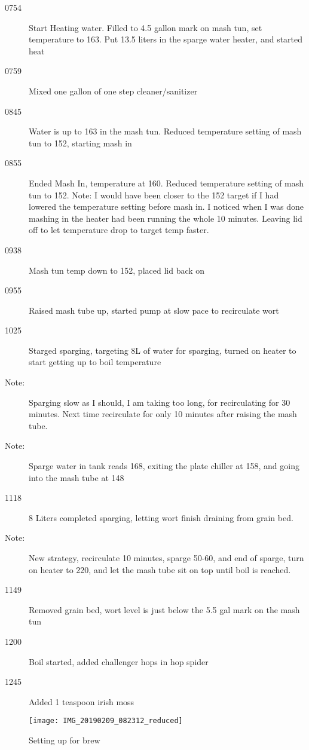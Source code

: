 \FloatBarrier{}
\begin{description}
    \item[0754] Start Heating water.  Filled to 4.5 gallon mark on mash tun, set temperature to 163.  Put 13.5 liters in the sparge water heater, and started heat
    \item[0759] Mixed one gallon of one step cleaner/sanitizer
    \item[0845] Water is up to 163 in the mash tun. Reduced temperature setting of mash tun to 152, starting mash in
    \item[0855] Ended Mash In, temperature at 160.  Reduced temperature setting of mash tun to 152.  Note: I would have been closer to the 152 target if I had lowered the temperature setting before mash in.  I noticed when I was done mashing in the heater had been running the whole 10 minutes.  Leaving lid off to let temperature drop to target temp faster.
    \item[0938] Mash tun temp down to 152, placed lid back on
    \item[0955] Raised mash tube up, started pump at slow pace to recirculate wort
    \item[1025] Starged sparging, targeting 8L of water for sparging, turned on heater to start getting up to boil temperature
    \item[Note:]  Sparging slow as I should, I am taking too long, for recirculating for 30 minutes.  Next time recirculate for only 10 minutes after raising the mash tube.
    \item[Note:]  Sparge water in tank reads 168, exiting the plate chiller at 158, and going into the mash tube at 148
    \item[1118] 8 Liters completed sparging, letting wort finish draining from grain bed.
    \item[Note:] New strategy, recirculate 10 minutes, sparge 50-60, and end of sparge, turn on heater to 220, and let the mash tube sit on top until boil is reached.
    \item[1149] Removed grain bed, wort level is just below the 5.5 gal mark on the mash tun
    \item[1200] Boil started, added challenger hops in hop spider
    \item[1245] Added 1 teaspoon irish moss
\end{description}

\begin{figure}[H]
  \centering
  \texttt{[image: IMG\_20190209\_082312\_reduced]}
  \caption{Setting up for brew}\label{fig:brew:setup}
\end{figure}

